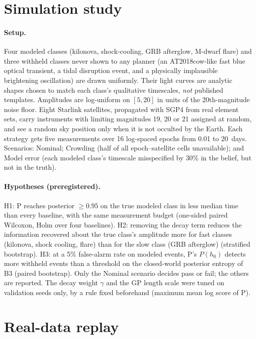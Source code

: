 \documentclass[12pt]{article}
\begin{document}
\section{Simulation study}\label{sec:sim}
\paragraph{Setup.} Four modeled classes (kilonova, shock-cooling, GRB afterglow, M-dwarf flare) and three withheld classes never shown to any planner (an AT2018cow-like fast blue optical transient, a tidal disruption event, and a physically implausible brightening oscillation) are drawn uniformly. Their light curves are analytic shapes chosen to match each class's qualitative timescales, \emph{not} published templates. Amplitudes are log-uniform on $[5,20]$ in units of the 20th-magnitude noise floor. Eight Starlink satellites, propagated with SGP4 from real element sets, carry instruments with limiting magnitudes 19, 20 or 21 assigned at random, and see a random sky position only when it is not occulted by the Earth. Each strategy gets five measurements over 16 log-spaced epochs from 0.01 to 20~days. Scenarios: Nominal; Crowding (half of all epoch--satellite cells unavailable); and Model error (each modeled class's timescale misspecified by 30\% in the belief, but not in the truth).

\paragraph{Hypotheses (preregistered).} H1: P reaches posterior $\geq 0.95$ on the true modeled class in less median time than every baseline, with the same measurement budget (one-sided paired Wilcoxon, Holm over four baselines). H2: removing the decay term reduces the information recovered about the true class's amplitude more for fast classes (kilonova, shock cooling, flare) than for the slow class (GRB afterglow) (stratified bootstrap). H3: at a 5\% false-alarm rate on modeled events, P's $P(h_0)$ detects more withheld events than a threshold on the closed-world posterior entropy of B3 (paired bootstrap). Only the Nominal scenario decides pass or fail; the others are reported. The decay weight $\gamma$ and the GP length scale were tuned on validation seeds only, by a rule fixed beforehand (maximum mean log score of P).



\section{Real-data replay}\label{sec:real}
\end{document}
